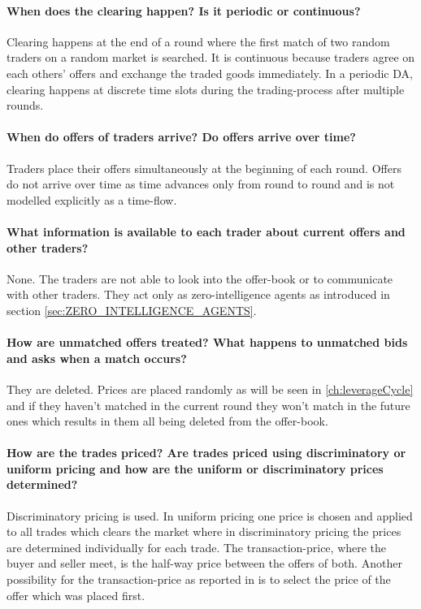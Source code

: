 \documentclass[../Bachelorarbeit.tex]{subfiles}
\begin{document}
\paragraph{When does the clearing happen? Is it periodic or continuous?} Clearing happens at the end of a round where the first match of two random traders on a random market is searched. It is continuous because traders agree on each others' offers and exchange the traded goods immediately. In a periodic DA, clearing happens at discrete time slots during the trading-process after multiple rounds.

\paragraph{When do offers of traders arrive? Do offers arrive over time?} Traders place their offers simultaneously at the beginning of each round. Offers do not arrive over time as time advances only from round to round and is not modelled explicitly as a time-flow.

\paragraph{What information is available to each trader about current offers and other traders?} None. The traders are not able to look into the offer-book or to communicate with other traders. They act only as \gls{zero-intelligence agents} as introduced in section \ref{sec:ZERO_INTELLIGENCE_AGENTS}.

\paragraph{How are unmatched offers treated? What happens to unmatched bids and asks when a match occurs?} They are deleted. Prices are placed randomly as will be seen in \ref{ch:leverageCycle} and if they haven't matched in the current round they won't match in the future ones which results in them all being deleted from the offer-book.

\paragraph{How are the trades priced? Are trades priced using discriminatory or uniform pricing and how are the uniform or discriminatory prices determined?} Discriminatory pricing is used. In uniform pricing one price is chosen and applied to all trades which clears the market where in discriminatory pricing the prices are determined individually for each trade. The \gls{transaction-price}, where the buyer and seller meet, is the half-way price between the offers of both. Another possibility for the transaction-price as reported in \cite{GodeSunder1993} is to select the price of the offer which was placed first.
\end{document}
